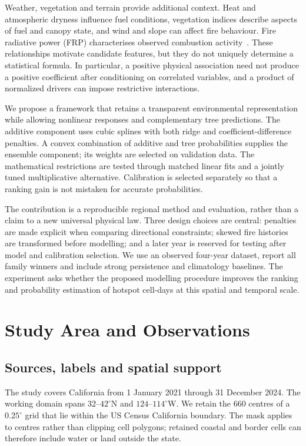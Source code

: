 \documentclass[conference]{IEEEtran}
\begin{document}
Weather, vegetation and terrain provide additional context. Heat and atmospheric dryness influence fuel conditions, vegetation indices describe aspects of fuel and canopy state, and wind and slope can affect fire behaviour. Fire radiative power (FRP) characterises observed combustion activity~\cite{wooster}. These relationships motivate candidate features, but they do not uniquely determine a statistical formula. In particular, a positive physical association need not produce a positive coefficient after conditioning on correlated variables, and a product of normalized drivers can impose restrictive interactions.

We propose a framework that retains a transparent environmental representation while allowing nonlinear responses and complementary tree predictions. The additive component uses cubic splines with both ridge and coefficient-difference penalties. A convex combination of additive and tree probabilities supplies the ensemble component; its weights are selected on validation data. The mathematical restrictions are tested through matched linear fits and a jointly tuned multiplicative alternative. Calibration is selected separately so that a ranking gain is not mistaken for accurate probabilities.

The contribution is a reproducible regional method and evaluation, rather than a claim to a new universal physical law. Three design choices are central: penalties are made explicit when comparing directional constraints; skewed fire histories are transformed before modelling; and a later year is reserved for testing after model and calibration selection. We use an observed four-year dataset, report all family winners and include strong persistence and climatology baselines. The experiment asks whether the proposed modelling procedure improves the ranking and probability estimation of hotspot cell-days at this spatial and temporal scale.

\section{Study Area and Observations}
\subsection{Sources, labels and spatial support}
The study covers California from 1 January 2021 through 31 December 2024. The working domain spans $32$--$42^\circ$N and $124$--$114^\circ$W. We retain the 660 centres of a $0.25^\circ$ grid that lie within the US Census California boundary. The mask applies to centres rather than clipping cell polygons; retained coastal and border cells can therefore include water or land outside the state.
\end{document}

